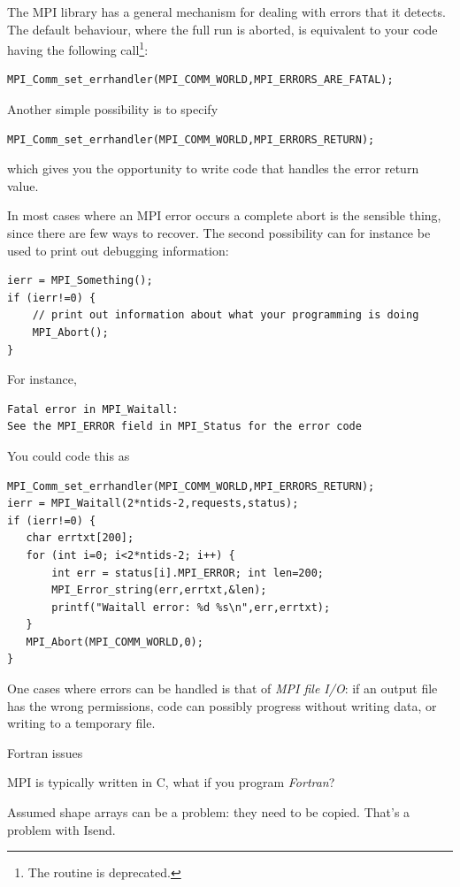 The MPI library has a general mechanism for dealing with errors that
it detects. The default behaviour, where the full run is aborted, is
equivalent to your code having the following
call\footnote{The routine
   is deprecated.}:
\begin{verbatim}
MPI_Comm_set_errhandler(MPI_COMM_WORLD,MPI_ERRORS_ARE_FATAL);
\end{verbatim}
Another simple possibility is to specify
\begin{verbatim}
MPI_Comm_set_errhandler(MPI_COMM_WORLD,MPI_ERRORS_RETURN);
\end{verbatim}
which gives you the opportunity to write code that handles the error
return value.

In most cases where an MPI error occurs a complete abort is the
sensible thing, since there are few ways to recover. The second
possibility can for instance be used to print out debugging
information:
\begin{verbatim}
ierr = MPI_Something();
if (ierr!=0) {
    // print out information about what your programming is doing
    MPI_Abort();
}
\end{verbatim}
For instance,
\begin{verbatim}
Fatal error in MPI_Waitall: 
See the MPI_ERROR field in MPI_Status for the error code
\end{verbatim}
You could code this as
\begin{verbatim}
MPI_Comm_set_errhandler(MPI_COMM_WORLD,MPI_ERRORS_RETURN);
ierr = MPI_Waitall(2*ntids-2,requests,status);
if (ierr!=0) {
   char errtxt[200];
   for (int i=0; i<2*ntids-2; i++) {
       int err = status[i].MPI_ERROR; int len=200;
       MPI_Error_string(err,errtxt,&len);
       printf("Waitall error: %d %s\n",err,errtxt);
   }
   MPI_Abort(MPI_COMM_WORLD,0);
}
\end{verbatim}
One cases where errors can be handled is that of \emph{MPI file
  I/O}: if an output file has the wrong
permissions, code can possibly progress without writing data, or
writing to a temporary file.

 {Fortran issues}

MPI is typically written in C, what if you program \emph{Fortran}?

Assumed shape arrays can be a problem: they need to be copied. 
That's a problem with Isend.

